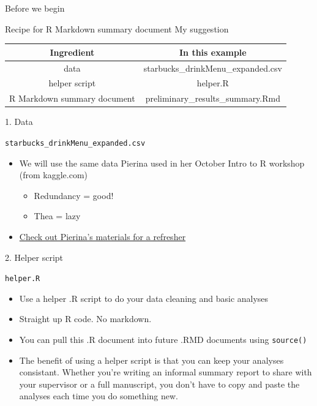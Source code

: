 \documentclass[
  ignorenonframetext,
]{beamer}
\providecommand{\tightlist}{%
  \setlength{\itemsep}{0pt}\setlength{\parskip}{0pt}}
\begin{document}
\begin{frame}[fragile]{Before we begin}
\protect\hypertarget{before-we-begin}{}

\begin{block}{Recipe for R Markdown summary document \textbar{} My
suggestion}

\begin{longtable}[]{@{}cc@{}}
\toprule
Ingredient & In this example\tabularnewline
\midrule
\endhead
data & starbucks\_drinkMenu\_expanded.csv\tabularnewline
helper script & helper.R\tabularnewline
R Markdown summary document &
preliminary\_results\_summary.Rmd\tabularnewline
\bottomrule
\end{longtable}

\end{block}

\begin{block}{1. Data}

\texttt{starbucks\_drinkMenu\_expanded.csv}

\begin{itemize}
\tightlist
\item
  We will use the same data Pierina used in her October Intro to R
  workshop (from kaggle.com)

  \begin{itemize}
  \tightlist
  \item
    Redundancy = good!
  \item
    Thea = lazy
  \end{itemize}
\item
  \href{https://www.meetup.com/rladies-ldnont/messages/boards/thread/51164998}{Check
  out Pierina's materials for a refresher}
\end{itemize}

\end{block}

\begin{block}{2. Helper script}

\texttt{helper.R}

\begin{itemize}
\tightlist
\item
  Use a helper .R script to do your data cleaning and basic analyses
\item
  Straight up R code. No markdown.
\item
  You can pull this .R document into future .RMD documents using
  \texttt{source()}
\item
  The benefit of using a helper script is that you can keep your
  analyses consistant. Whether you're writing an informal summary report
  to share with your supervisor or a full manuscript, you don't have to
  copy and paste the analyses each time you do something new.
\end{itemize}


\end{block}
\end{frame}
\end{document}
